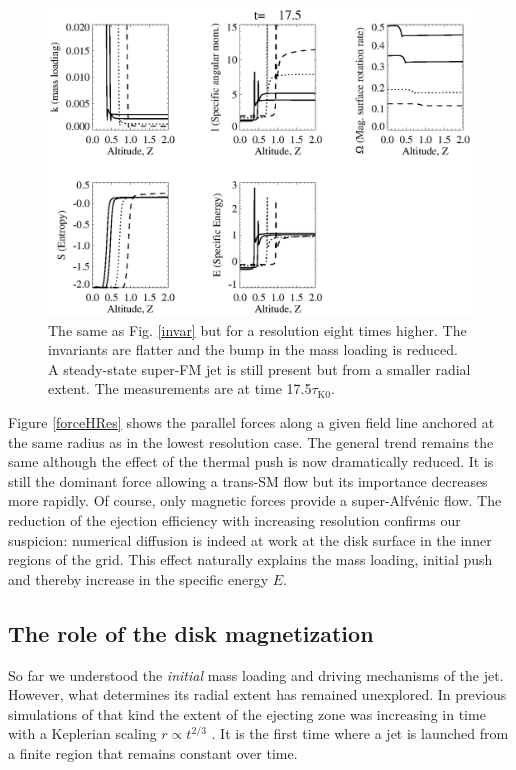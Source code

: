 \documentclass{aa}
\begin{document}
   \begin{figure}
   \sidecaption
    \includegraphics[width=12cm]{12633f14.eps}
   \caption{The same as Fig. \ref{invar} but for a resolution eight times higher.  The invariants are flatter and the bump in the mass loading is reduced. A steady-state super-FM jet is still
		present but from a smaller radial extent. The measurements are at time 17.5$\tau_\mathrm{K0}$.  }
              \label{invarhires}%
    \end{figure}

Figure \ref{forceHRes} shows the parallel forces along a given field line anchored at the same radius as in the lowest resolution case. The general trend remains the same although the effect of the
thermal push is now dramatically reduced. It is still the dominant force allowing a trans-SM flow but its importance decreases more rapidly. Of course, only magnetic forces provide a super-Alfv\'enic
flow.
%
 The reduction of the ejection efficiency with increasing resolution confirms our suspicion: numerical diffusion is indeed at work at the disk surface in the inner regions of the grid. This effect
 naturally explains the mass loading, initial push and thereby increase in the specific energy $E$.


\subsection{The role of the disk magnetization}
So far we understood the {\em initial} mass loading and driving mechanisms of the jet. However, what determines its radial extent has remained unexplored. In previous simulations of that kind the
extent of the ejecting zone was increasing in time with a Keplerian scaling $r \propto t^{2/3}$ \citep{2002ApJ...581..988C,2004ApJ...601...90C,2007A&A...469..811Z}. It is the first time where a jet is
launched from a finite region that remains constant over time.
\end{document}
